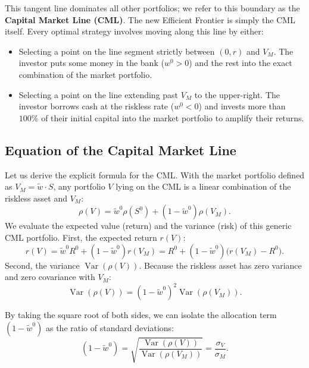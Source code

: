This tangent line dominates all other portfolios; we refer to this boundary as the \textbf{Capital Market Line (CML)}. The new Efficient Frontier is simply the CML itself. Every optimal strategy involves moving along this line by either:
\begin{itemize}
    \item {} Selecting a point on the line segment strictly between $(0, r)$ and $V_M$. The investor puts some money in the bank ($w^0 > 0$) and the rest into the exact combination of the market portfolio.
    \item {} Selecting a point on the line extending past $V_M$ to the upper-right. The investor borrows cash at the riskless rate ($w^0 < 0$) and invests more than $100\%$ of their initial capital into the market portfolio to amplify their returns.
\end{itemize}

\subsection{Equation of the Capital Market Line}

Let us derive the explicit formula for the CML. With the market portfolio defined as $V_M = \tilde{w} \cdot S$, any portfolio $V$ lying on the CML is a linear combination of the riskless asset and $V_M$:
\begin{equation}
    \rho(V) = \tilde{w}^0 \rho(S^0) + (1 - \tilde{w}^0) \rho(V_M).
\end{equation}
We evaluate the expected value (return) and the variance (risk) of this generic CML portfolio. First, the expected return $r(V)$:
\begin{equation}
    r(V) = \tilde{w}^0 R^0 + (1 - \tilde{w}^0) r(V_M) = R^0 + (1 - \tilde{w}^0) \big( r(V_M) - R^0 \big). \label{eq:cml_return}
\end{equation}
Second, the variance $\operatorname{Var}(\rho(V))$. Because the riskless asset has zero variance and zero covariance with $V_M$:
\begin{equation}
    \operatorname{Var}(\rho(V)) = (1 - \tilde{w}^0)^2 \operatorname{Var}(\rho(V_M)). \label{eq:cml_variance}
\end{equation}

By taking the square root of both sides, we can isolate the allocation term $(1 - \tilde{w}^0)$ as the ratio of standard deviations:
\begin{equation*}
    (1 - \tilde{w}^0) = \sqrt{ \frac{\operatorname{Var}(\rho(V))}{\operatorname{Var}(\rho(V_M))} } = \frac{\sigma_V}{\sigma_{M}}.
\end{equation*}

